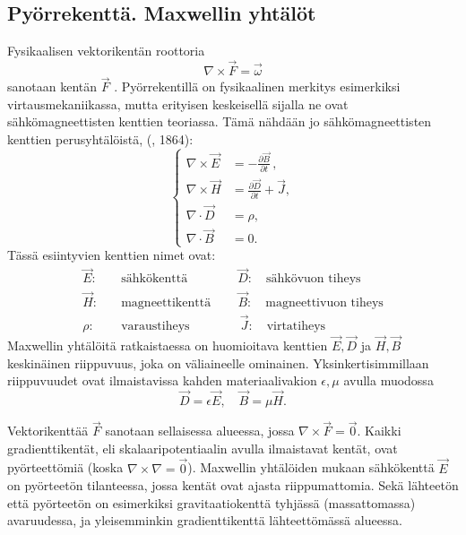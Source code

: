 \subsection{Pyörrekenttä.  Maxwellin yhtälöt}

Fysikaalisen vektorikentän roottoria
\[
\nabla\times\vec F=\vec \omega
\]
%
sanotaan kentän $\vec F$ . Pyörrekentillä on fysikaalinen merkitys 
esimerkiksi virtausmekaniikassa, mutta erityisen keskeisellä sijalla ne ovat sähkömagneettisten
kenttien teoriassa. Tämä nähdään jo sähkömagneettisten kenttien perusyhtälöistä, 
 (, 1864): 
\[
\left\{\begin{aligned}
\nabla\times\vec E &= -\frac{\partial \vec B}{\partial t}\,, \\
\nabla\times\vec H &=  \frac{\partial \vec D}{\partial t}+\vec J, \\[2mm]
\nabla\cdot\vec D &=\rho, \\[3mm]
\nabla\cdot\vec B &= 0.
\end{aligned}\right.
\]
Tässä esiintyvien kenttien nimet ovat:
\begin{align*}
\vec E: \quad &\text{sähkökenttä} \qquad\qquad \vec D: \quad \text{sähkövuon tiheys} \\
\vec H: \quad &\text{magneettikenttä} \qquad\, \vec B: \quad \text{magneettivuon tiheys} \\
\rho  : \quad &\text{varaustiheys} \qquad\qquad \vec J: \quad \text{virtatiheys}
\end{align*}
Maxwellin yhtälöitä ratkaistaessa on huomioitava kenttien $\vec E,\vec D$ ja $\vec H,\vec B$
keskinäinen riippuvuus, joka on väliaineelle ominainen. Yksinkertisimmillaan riippuvuudet ovat
ilmaistavissa kahden materiaalivakion $\epsilon,\mu$ avulla muodossa 
\[
\vec D=\epsilon\vec E, \quad \vec B=\mu\vec H.
\]

Vektorikenttää $\vec F$ sanotaan  sellaisessa alueessa, jossa 
$\nabla\times\vec F=\vec 0$. Kaikki gradienttikentät, eli skalaaripotentiaalin avulla 
ilmaistavat kentät, ovat pyörteettömiä (koska $\nabla\times\nabla=\vec 0$). Maxwellin
yhtälöiden mukaan sähkökenttä $\vec E$ on pyörteetön  tilanteessa, jossa
kentät ovat ajasta riippumattomia. Sekä lähteetön että pyörteetön on esimerkiksi 
gravitaatiokenttä tyhjässä (massattomassa) avaruudessa, ja yleisemminkin gradienttikenttä 
lähteettömässä alueessa.

